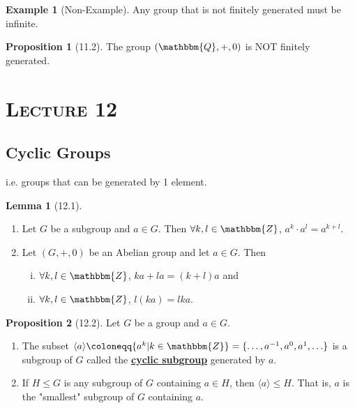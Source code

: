 \documentclass{article}
\newcommand{\Z}{\mathbbm{Z}}
\newcommand{\Q}{\mathbbm{Q}}
\newcommand{\coleq}{\coloneqq}
\newcommand{\inverse}[1]{#1^{-1}}
\newcommand{\define}[1]{\textbf{\underline{#1}}}
\theoremstyle{definition}
\newtheorem*{prop}{Proposition}
\newtheorem*{ex}{Example}
\newtheorem*{lem}{Lemma}
\theoremstyle{remark}
\newcommand{\cyc}[1]{\langle#1\rangle}
\begin{document}
{        \begin{ex}[Non-Example]
            Any group that is not finitely generated must be infinite.
        \end{ex}
        
        \begin{prop}[11.2]
            The group $(\Q,+,0)$ is NOT finitely generated. 
        \end{prop}
    }
    
    \section*{\textbf{\textsc{Lecture 12}}}{
        \subsection*{Cyclic Groups}{
        i.e. groups that can be generated by 1 element.
        
        \begin{lem}[12.1]\hfill
            \begin{enumerate}
                \item Let $G$ be a subgroup and $a \in G$. Then $\forall k,l \in \Z$, $a^k\cdot a^l=a^{k+l}$.
                \item Let $(G,+,0)$ be an Abelian group and let $a \in G$. Then
                \begin{enumerate}[i.]
                    \item $\forall k,l \in \Z$, $ka+la=(k+l)a$ and
                    \item $\forall k,l \in \Z$, $l(ka)=lka$.
                \end{enumerate}
            \end{enumerate}
        \end{lem}
        
        \begin{prop}[12.2]
            Let $G$ be a group and $a \in G$.
            \begin{enumerate}
                \item The subset $\cyc{a}\coleq \{a^k|k\in\Z\}=\{\ldots,\inverse{a},a^0,a^1,\ldots\}$ is a subgroup of $G$ called the \define{cyclic subgroup} generated by $a$.
                \item If $H\leq G$ is any subgroup of $G$ containing $a \in H$, then $\cyc{a}\leq H$. That is, $a$ is the "smallest" subgroup of $G$ containing $a$.
            \end{enumerate}
        \end{prop}
        
}}
\end{document}

